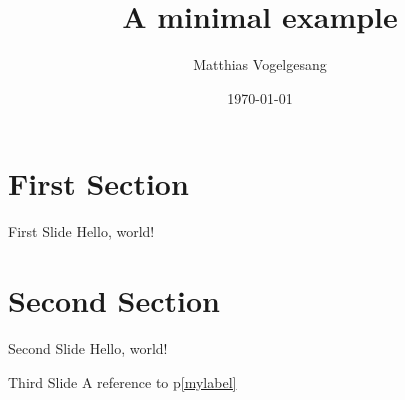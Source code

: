 \documentclass{beamer}
\title{A minimal example}
\date{\today}
\author{Matthias Vogelgesang}
\institute{Centre for Modern Beamer Themes}
\begin{document}
    \maketitle
    \section{First Section}
    \begin{frame}{First Slide}
        Hello, world!
    \end{frame}
    \section{Second Section}
    \begin{frame}[label=mylabel]{Second Slide}
        Hello, world!
    \end{frame}
    \begin{frame}{Third Slide}
        A reference to p\ref{mylabel}
    \end{frame}
\end{document}
